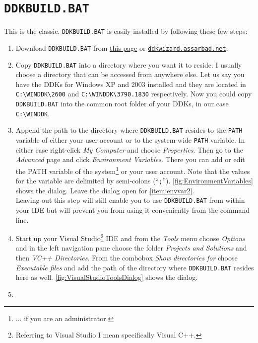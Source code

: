 \documentclass[a4paper,titlepage]{report}
\newcommand{\linkclr}[1]{\textcolor[rgb]{0.00,0.00,0.60}{#1}}
\newcommand{\extlink}[2]{\href{#1}{\linkclr{#2}}}
\newcommand{\extlinktt}[2]{\href{#1}{\texttt{\linkclr{#2}}}}
\begin{document}
\section{\texttt{DDKBUILD.BAT}}
\label{sec:batchversion}
This is the classic. \texttt{DDKBUILD.BAT} is easily installed by following these
few steps:
\begin{enumerate}
  \item
    Download \texttt{DDKBUILD.BAT} from \extlink{http://www.osronline.com/article.cfm?article=43}{this page}
    or \extlinktt{http://ddkwizard.assarbad.net}{ddkwizard.assarbad.net}.
  \item
    Copy \texttt{DDKBUILD.BAT} into a directory where you want it to reside. I usually
    choose a directory that can be accessed from anywhere else. Let us say you have
    the DDKs for Windows XP and 2003 installed and they are located in \verb+C:\WINDDK\2600+
    and \verb+C:\WINDDK\3790.1830+ respectively. Now you could copy \texttt{DDKBUILD.BAT}
    into the common root folder of your DDKs, in our case \verb+C:\WINDDK+.
  \item \label{item:envvar1}
    Append the path to the directory where \texttt{DDKBUILD.BAT} resides to the \texttt{PATH}
    variable of either your user account or to the system-wide \texttt{PATH} variable. In
    either case right-click \emph{My Computer} and choose \emph{Properties}. Then go to the
    \emph{Advanced} page and click \emph{Environment Variables}. There you can add or edit
    the PATH variable of the system\footnote{... if you are an administrator.} or your user
    account. Note that the values for the variable are delimited by semi-colons (``\texttt{;}'').
    \autoref{fig:EnvironmentVariables} shows the dialog. Leave the dialog open for
    \autoref{item:envvar2}.\\
    Leaving out this step will still enable you to use \texttt{DDKBUILD.BAT} from within
    your IDE but will prevent you from using it conveniently from the command line.
  \item
    Start up your Visual Studio\footnote{Referring to Visual Studio I mean specifically
    Visual C++.} IDE and from the \emph{Tools} menu choose \emph{Options} and in the left
    navigation pane choose the folder \emph{Projects and Solutions} and then \emph{VC++ Directories}.
    From the combobox \emph{Show directories for} choose \emph{Executable files} and add the
    path of the directory where \texttt{DDKBUILD.BAT} resides here as well.
    \autoref{fig:VisualStudioToolsDialog} shows the dialog.
  \item \label{item:envvar2}

\end{enumerate}
\end{document}
